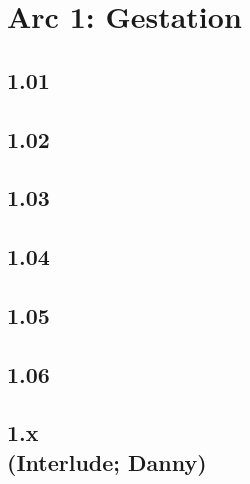 \part*{Arc 1: Gestation}
\chapter*{1.01}


\chapter*{1.02}


\chapter*{1.03}


\chapter*{1.04}


\chapter*{1.05}


\chapter*{1.06}


\chapter*{1.x\\(Interlude; Danny)}

